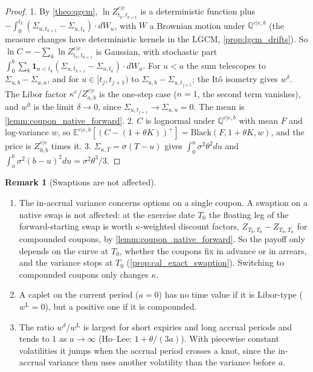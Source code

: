 \documentclass[11pt,english]{amsart}
\newcommand{\EE}{\mathbb{E}}
\newcommand{\QQ}{\mathbb{Q}}
\theoremstyle{definition}
\newtheorem{rema}{Remark}
\begin{document}
\begin{proof}
1. By \autoref{theo:qgcm}, $\ln Z^{e|e}_{t_k,t_{k+1}}$ is a deterministic function plus $-\int_0^{t_k}(\Sigma_{u,t_{k+1}}-\Sigma_{u,t_k})\cdot dW_u$, with $W$ a Brownian motion under $\QQ^{e|e,b}$ (the measure changes have deterministic kernels in the LGCM, \autoref{prop:lgcm_drifts}). So $\ln C = -\sum_k\ln Z^{e|e}_{t_k,t_{k+1}}$ is Gaussian, with stochastic part $\int_0^b \sum_k \mathbf{1}_{u<t_k}(\Sigma_{u,t_{k+1}}-\Sigma_{u,t_k})\cdot dW_u$. For $u<a$ the sum telescopes to $\Sigma_{u,b}-\Sigma_{u,a}$, and for $u\in[t_j,t_{j+1})$ to $\Sigma_{u,b}-\Sigma_{u,t_{j+1}}$; the It\^o isometry gives $w^\delta$. The Libor factor $\kappa^e/Z^{e|e}_{a,b}$ is the one-step case ($n = 1$, the second term vanishes), and $w^0$ is the limit $\delta\to0$, since $\Sigma_{u,t_{j+1}}\to\Sigma_{u,u} = 0$. The mean is \autoref{lemm:coupon_native_forward}. 2. $C$ is lognormal under $\QQ^{e|e,b}$ with mean $F$ and log-variance $w$, so $\EE^{e|e,b}[(C-(1+\theta K))^+] = \mathrm{Black}(F,1+\theta K,w)$, and the price is $Z^{e|e}_{0,b}$ times it. 3. $\Sigma_{u,T} = \sigma(T-u)$ gives $\int_0^a\sigma^2\theta^2du$ and $\int_a^b\sigma^2(b-u)^2du = \sigma^2\theta^3/3$.
\end{proof}

\begin{rema}[Swaptions are not affected]\label{rema:lgcm_caplet_swaptions}
\begin{enumerate}
\item The in-accrual variance concerns options on a single coupon. A swaption on a native swap is not affected: at the exercise date $T_0$ the floating leg of the forward-starting swap is worth $\kappa$-weighted discount factors, $Z_{T_0,T_0} - Z_{T_0,T_n}$ for compounded coupons, by \autoref{lemm:coupon_native_forward}. So the payoff only depends on the curve at $T_0$, whether the coupons fix in advance or in arrears, and the variance stops at $T_0$ (\autoref{prop:cal_exact_swaption}). Switching to compounded coupons only changes $\kappa$.
\item A caplet on the current period ($a = 0$) has no time value if it is Libor-type ($w^{\mathrm{L}} = 0$), but a positive one if it is compounded.
\item The ratio $w^\delta/w^{\mathrm{L}}$ is largest for short expiries and long accrual periods and tends to $1$ as $a\to\infty$ (Ho--Lee: $1+\theta/(3a)$). With piecewise constant volatilities it jumps when the accrual period crosses a knot, since the in-accrual variance then uses another volatility than the variance before $a$.
\end{enumerate}
\end{rema}
\end{document}
